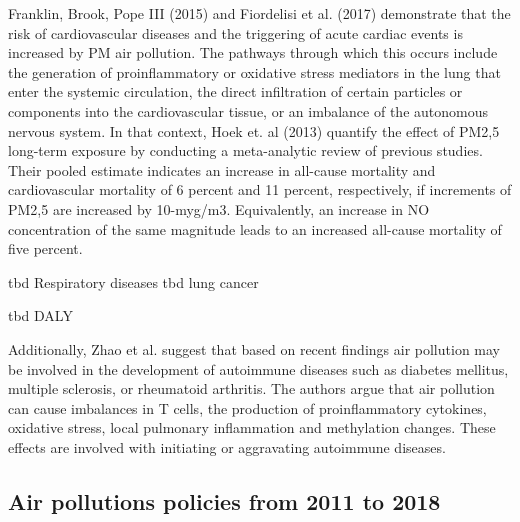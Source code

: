 \documentclass[
]{article}
\begin{document}
Franklin, Brook, Pope III (2015) and Fiordelisi et al. (2017) demonstrate that the risk of cardiovascular diseases and the triggering of acute cardiac events is increased by PM air pollution. The pathways through which this occurs include the generation of proinflammatory or oxidative stress mediators in the lung that enter the systemic circulation, the direct infiltration of certain particles or components into the cardiovascular tissue, or an imbalance of the autonomous nervous system. In that context, Hoek et. al (2013) quantify the effect of PM2,5 long-term exposure by conducting a meta-analytic review of previous studies. Their pooled estimate indicates an increase in all-cause mortality and cardiovascular mortality of 6 percent and 11 percent, respectively, if increments of PM2,5 are increased by 10-myg/m3. Equivalently, an increase in NO concentration of the same magnitude leads to an increased all-cause mortality of five percent. %

tbd Respiratory diseases %
tbd lung cancer %

tbd DALY %

Additionally, Zhao et al. suggest that based on recent findings air pollution may be involved in the development of autoimmune diseases such as diabetes mellitus, multiple sclerosis, or rheumatoid arthritis. The authors argue that air pollution can cause imbalances in T cells, the production of proinflammatory cytokines, oxidative stress, local pulmonary inflammation and methylation changes. These effects are involved with initiating or aggravating autoimmune diseases. %



\subsection{Air pollutions policies from 2011 to 2018}
\end{document}

